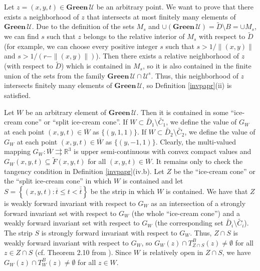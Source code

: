 \documentclass[a4paper]{article}
\begin{document}
Let $z=(x,y,t) \in \mathbf{Green} \,\mathcal{U}$ be an arbitrary point. We want to prove that there exists a neighborhood of $z$ that intersects at most finitely many elements of $\mathbf{Green} \,\mathcal{U}$. Due to the definition of the sets $M_s$ and $\cup(\mathbf{Green} \,\mathcal{U}) = \widetilde{D} \setminus B = \cup M_s$, we can find $s$ such that $z$ belongs to the relative interior of $M_s$ with respect to $\widetilde{D}$ (for example, we can choose every positive integer $s$ such that $s > 1/\|(x,y)\|$ and $s > 1/(r-\|(x,y)\|)$). Then there exists a relative neighborhood of $z$ (with respect to $\widetilde{D}$) which is contained in $M_s$, so it is also contained in the finite union of the sets from the family $\mathbf{Green} \,\mathcal{U} \cap \mathcal{U}^s$. Thus, this neighborhood of $z$ intersects finitely many elements of $\mathbf{Green} \,\mathcal{U}$, so Definition \ref{invpapr}(ii) is satisfied.

Let $W$ be an arbitrary element of $\mathbf{Green} \,\mathcal{U}$. Then it is contained in some ``ice-cream cone'' or ``split ice-cream cone''. If $W \subset \widetilde{D_1} \setminus \widetilde{C_1}$, we define the value of $G_W$ at each point $(x,y,t) \in \overline{W}$ as $\{(y,1,1)\}$. If $W \subset \widetilde{D_2} \setminus \widetilde{C_2}$, we define the value of $G_W$ at each point $(x,y,t) \in \overline{W}$ as $\{(y,-1,1)\}$. Clearly, the multi-valued mapping $G_W : \overline{W} \rightrightarrows \mathbb{R}^3$ is upper semi-continuous with convex compact values and $G_W(x,y,t) \subseteq \widetilde{F}(x,y,t)$ for all $(x,y,t) \in \overline{W}$. It remains only to check the tangency condition in Definition \ref{invpapr}(iv.b). Let $Z$ be the ``ice-cream cone'' or the ``split ice-cream cone'' in which $W$ is contained and let $S=\left\{(x,y,t) : \overline{t} \le t < \overline{\overline{t}}\right\}$ be the strip in which $W$ is contained. We have that $Z$ is weakly forward invariant with respect to $G_W$ as an intersection of a strongly forward invariant set with respect to $G_W$ (the whole ``ice-cream cone'') and a weakly forward invariant set with respect to $G_W$ (the corresponding set $\widetilde{D_i} \setminus \widetilde{C_i}$). The strip $S$ is strongly forward invariant with respect to $G_W$. Thus, $Z \cap S$ is weakly forward invariant with respect to $G_W$, so $G_W(z) \cap T^B_{Z \cap S}(z) \ne \emptyset$ for all $z \in Z \cap S$ (cf. Theorem 2.10 from \cite{CLSW}). Since $W$ is relatively open in $Z \cap S$, we have $G_W(z) \cap T^B_{W}(z) \ne \emptyset$ for all $z \in W$.
\end{document}
